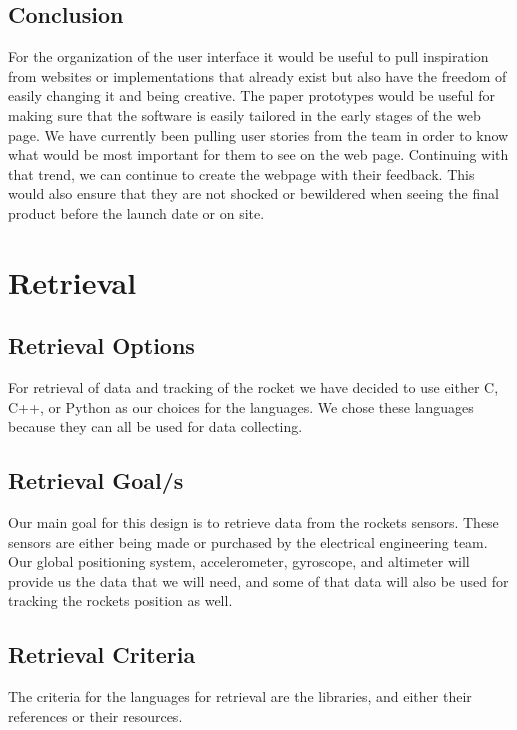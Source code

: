 \documentclass[10pt,draftclsnofoot,onecolumn]{IEEEtran}
\begin{document}
	\subsection{Conclusion}
	For the organization of the user interface it would be useful to pull inspiration from websites or implementations
	that already exist but also have the freedom of easily changing it and being creative. 
	The paper prototypes would be useful for making sure that the software is easily tailored in the early stages of the 
	web page. 
	We have currently been pulling user stories from the team in order to know what would be most important for them to 
	see on the web page. 
	Continuing with that trend, we can continue to create the webpage with their feedback. 
	This would also ensure that they are not shocked or bewildered when seeing the final product before the launch date
	or on site.
	
	\section{Retrieval}
\subsection{Retrieval Options}
 For retrieval of data and tracking of the rocket we have decided to use either C, C++, or Python as our choices for the languages.  We chose these languages because they can all be used for data collecting.
 \subsection{Retrieval Goal/s}
 Our main goal for this design is to retrieve data from the rockets sensors.  These sensors are either being made or purchased by the electrical engineering team.  Our global positioning system, accelerometer, gyroscope, and altimeter will provide us the data that we will need, and some of that data will also be used for tracking the rockets position as well.
  \subsection{Retrieval Criteria}
   The criteria for the languages for retrieval are the libraries, and either their references or their resources.
\end{document}
